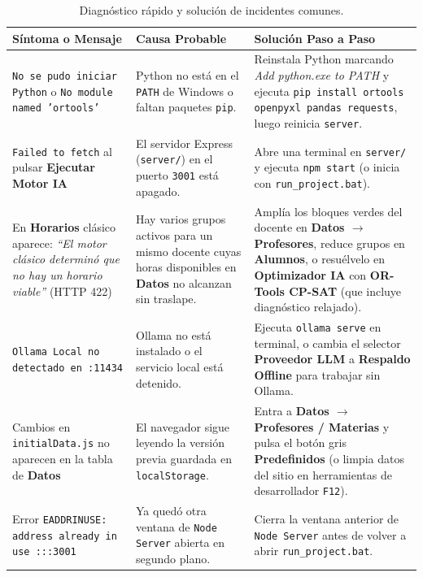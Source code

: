 \documentclass[11pt,letterpaper]{article}
\begin{document}
\begin{table}[htbp]
\centering
\small
\caption{Diagnóstico rápido y solución de incidentes comunes.}
\label{tab:errores}
\begin{tabularx}{\textwidth}{@{}>{\raggedright\arraybackslash}p{4.3cm}>{\raggedright\arraybackslash}p{4.4cm}>{\raggedright\arraybackslash}X@{}}
\toprule
\textbf{Síntoma o Mensaje} & \textbf{Causa Probable} & \textbf{Solución Paso a Paso} \\
\midrule
\texttt{No se pudo iniciar Python} o \texttt{No module named 'ortools'} & Python no está en el \texttt{PATH} de Windows o faltan paquetes \texttt{pip}. & Reinstala Python marcando \textit{Add python.exe to PATH} y ejecuta \texttt{pip install ortools openpyxl pandas requests}, luego reinicia \texttt{server}. \\
\addlinespace[3pt]
\texttt{Failed to fetch} al pulsar \textbf{Ejecutar Motor IA} & El servidor Express (\texttt{server/}) en el puerto \texttt{3001} está apagado. & Abre una terminal en \texttt{server/} y ejecuta \texttt{npm start} (o inicia con \texttt{run\_project.bat}). \\
\addlinespace[3pt]
En \textbf{Horarios} clásico aparece: \textit{``El motor clásico determinó que no hay un horario viable''} (HTTP 422) & Hay varios grupos activos para un mismo docente cuyas horas disponibles en \textbf{Datos} no alcanzan sin traslape. & Amplía los bloques verdes del docente en \textbf{Datos $\rightarrow$ Profesores}, reduce grupos en \textbf{Alumnos}, o resuélvelo en \textbf{Optimizador IA} con \textbf{OR-Tools CP-SAT} (que incluye diagnóstico relajado). \\
\addlinespace[3pt]
\texttt{Ollama Local no detectado en :11434} & Ollama no está instalado o el servicio local está detenido. & Ejecuta \texttt{ollama serve} en terminal, o cambia el selector \textbf{Proveedor LLM} a \textbf{Respaldo Offline} para trabajar sin Ollama. \\
\addlinespace[3pt]
Cambios en \texttt{initialData.js} no aparecen en la tabla de \textbf{Datos} & El navegador sigue leyendo la versión previa guardada en \texttt{localStorage}. & Entra a \textbf{Datos $\rightarrow$ Profesores / Materias} y pulsa el botón gris \textbf{Predefinidos} (o limpia datos del sitio en herramientas de desarrollador \texttt{F12}). \\
\addlinespace[3pt]
Error \texttt{EADDRINUSE: address already in use :::3001} & Ya quedó otra ventana de \texttt{Node Server} abierta en segundo plano. & Cierra la ventana anterior de \texttt{Node Server} antes de volver a abrir \texttt{run\_project.bat}. \\
\bottomrule
\end{tabularx}
\end{table}
\end{document}
